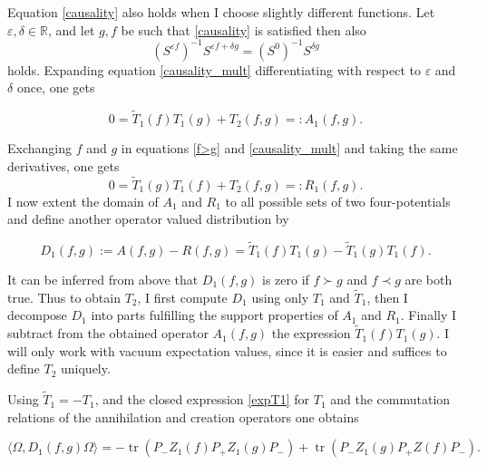 \documentclass[b5paper,draft,openbib,12pt]{memoir}
\DeclareMathOperator{\tr}{tr}
\begin{document}
 Equation \eqref{causality} also holds when I choose slightly different functions. Let \(\varepsilon, \delta\in \mathbb{R}\), and let \(g,f\) be such that \eqref{causality} is satisfied  then also
\begin{equation}\label{causality_mult}
\left( S^{\varepsilon f} \right)^{-1} S^{\varepsilon f+ \delta g}= \left( S^0 \right)^{-1} S^{\delta g}
\end{equation}
holds. Expanding equation \eqref{causality_mult} differentiating with respect to \(\varepsilon\) and \(\delta\) once, one gets

\begin{equation}\label{defA_1}
0=\tilde{T}_1 (f) T_1(g) + T_2(f,g)=:A_1(f,g).
\end{equation}

Exchanging \(f\) and \(g\) in equations \eqref{f>g} and \eqref{causality_mult} and taking the same derivatives, one gets 
\begin{equation}\label{defR_1}
0=\tilde{T}_1 (g) T_1(f) + T_2(f,g)=:R_1(f,g).
\end{equation}
I now extent the domain of \(A_1\) and \(R_1\) to all possible sets of two four-potentials and define another operator valued distribution by 

\begin{equation}\label{defD_1}
D_1(f,g):=A(f,g)-R(f,g)=\tilde{T}_1 (f) T_1(g)-\tilde{T}_1 (g) T_1(f) .
\end{equation}

It can be inferred from above that \(D_1(f,g)\) is zero if \(f\succ g\) and \(f\prec g\) are both true. Thus to obtain \(T_2\), I first compute \(D_1\) using only \(T_1\) and \(\tilde{T}_1\), then I decompose \(D_1\) into parts fulfilling the support properties of \(A_1\) and \(R_1\). Finally I subtract from the obtained operator \(A_1 (f,g)\) the expression \(\tilde{T}_1(f)T_1(g)\). I will only work with vacuum expectation values, since it is easier and suffices to define \(T_2\) uniquely.

Using \(\tilde{T}_1=-T_1\), and the closed expression \eqref{expT1} for \(T_1\) and the commutation relations of the annihilation and creation operators one obtains

\begin{equation}
\langle \Omega, D_1(f,g) \Omega \rangle= - \tr \left( P_- Z_1(f)P_+ Z_1(g)P_- \right)+  \tr \left(P_- Z_1(g) P_+ Z(f)P_- \right).
\end{equation}

\end{document}
